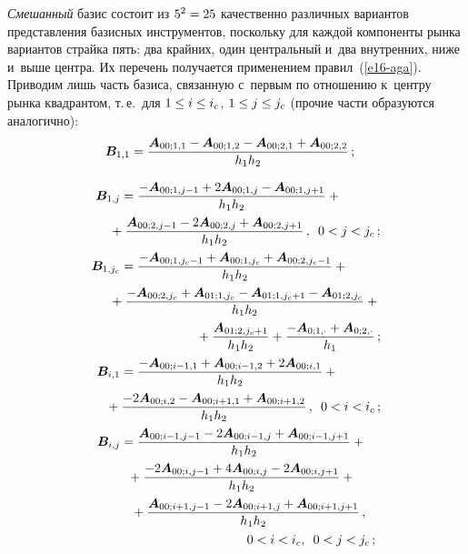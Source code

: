 \begin{multicols}{2}
  \textit{Смешанный} базис состоит из $5^2\hm=25$ качественно различных 
вариантов представления базисных инструментов, поскольку для каждой 
компоненты рынка вариантов страйка пять: два крайних, один центральный 
и~два внутренних, ниже и~выше центра. Их перечень получается применением 
правил~(\ref{e16-aga}). Приводим лишь часть базиса, связанную с~первым по 
отношению к~центру рынка квадрантом, т.\,е.\ для $1 \hm\leq i \hm\leq i_c$, $1 
\hm\leq j \hm\leq j_c$ (прочие части образуются аналогично):
  \begin{align*}
  \bm{B}_{1,1}&=\displaystyle\frac{\displaystyle \bm{A}_{00;1,1} - \bm{A}_{00;1,2} - \bm{A}_{00;2,1} + 
\bm{A}_{00;2,2}\mathstrut}{\displaystyle h_1h_2\mathstrut}\,; 
\end{align*}

  \noindent
  \begin{align*}
  \bm{B}_{1,j}&=\fr{-\bm{A}_{00;1,j-1} + 2\bm{A}_{00;1,j} - \bm{A}_{00;1,j+1}}{h_1h_2} + {}\\
&\hspace*{-3mm}{}+
\fr{\bm{A}_{00;2,j-1} - 2\bm{A}_{00;2,j} + \bm{A}_{00;2,j+1}}{h_1h_2}\,,\enskip 0<j<j_c\,; \\
  \bm{B}_{1,j_c}&=\fr{- \bm{A}_{00;1,j_c-1} + \bm{A}_{00;1,j_c} + \bm{A}_{00;2,j_c - 1}}{h_1h_2} +{}\\
  &\hspace*{-3mm}{}+  
  \fr{- \bm{A}_{00;2,j_c} + \bm{A}_{01;1,j_c} - \bm{A}_{01;1,j_c+1} - \bm{A}_{01;2,j_c} }{h_1h_2}+{}\\
&\hspace*{21mm}{}+ \fr{\bm{A}_{01;2,j_c+1}}{h_1h_2} + \fr{- \bm{A}_{0;1,\cdot} + \bm{A}_{0;2,\cdot}}{h_1}\,; \\
  \bm{B}_{i,1}&=\fr{-\bm{A}_{00;i-1,1} + \bm{A}_{00;i-1,2} + 2\bm{A}_{00;i,1}}{h_1h_2}+{}\\
  &\hspace*{-4mm}{}+ \fr{ -  2\bm{A}_{00;i,2} - \bm{A}_{00;i+1,1} + \bm{A}_{00;i+1,2}}{h_1h_2}\,,\enskip   0<i<i_c\,; \\
  \bm{B}_{i,j}&= \fr{\bm{A}_{00;i-1,j-1} - 2\bm{A}_{00;i-1,j} + \bm{A}_{00;i-1,j+1}}{h_1h_2}+{}\\
  &\hspace*{2mm}{}+ \fr{- 2\bm{A}_{00;i,j-1} + 4\bm{A}_{00;i,j} - 2\bm{A}_{00;i,j+1}}{h_1h_2} +{}\\
&\hspace*{3mm}{}+\fr{\bm{A}_{00;i+1,j-1} - 2\bm{A}_{00;i+1,j} + \bm{A}_{00;i+1,j+1}}{h_1h_2}\,,\\
    & \hspace*{35mm}0<i<i_c,\enskip  0<j<j_c\,; \\

\end{align*}
\end{multicols}
